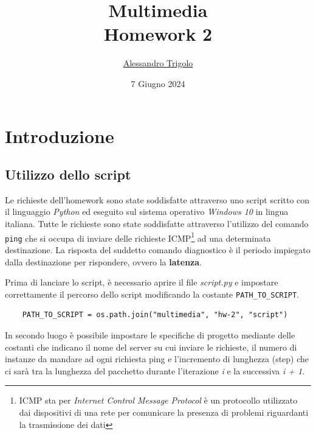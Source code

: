 \title{\vspace{160px} \textbf{\huge{Multimedia}} \\\vspace{17.5px} \LARGE{Homework 2}  \vspace{10px}}
\author{\href{https://github.com/imAlessas}{Alessandro Trigolo}}
\date{7 Giugno 2024}



\maketitle\newpage

\tableofcontents
\vspace{50px}
\listoffigures
\newpage

\listoftodos\newpage

\section{Introduzione}

\vspace{15px}\subsection{Utilizzo dello script}

Le richieste dell'homework sono state soddisfatte attraverso uno script scritto con il linguaggio \textsl{Python} ed eseguito sul sistema operativo \textsl{Windows 10} in lingua italiana. Tutte le richieste sono state soddisfatte attraverso l'utilizzo del comando \texttt{ping} che si occupa di inviare delle richieste ICMP\footnote{ICMP sta per \textsl{Internet Control Message Protocol} è un protocollo utilizzato dai dispositivi di una rete per comunicare la presenza di problemi riguardanti la trasmissione dei dati} ad una determinata destinazione. La risposta del suddetto comando diagnostico è il periodo impiegato dalla destinazione per rispondere, ovvero la \textbf{latenza}.

Prima di lanciare lo script, è necessario aprire il file \textsl{script.py} e impostare correttamente il percorso dello script modificando la costante \texttt{PATH\_TO\_SCRIPT}.
\begin{lstlisting}
    PATH_TO_SCRIPT = os.path.join("multimedia", "hw-2", "script")
\end{lstlisting}

\noindent In secondo luogo è possibile impostare le specifiche di progetto mediante delle costanti che indicano il nome del server su cui inviare le richieste, il numero di instanze da mandare ad ogni richiesta ping e l'incremento di lunghezza (step) che ci sarà tra la lunghezza del pacchetto durante l'iterazione \textit{i} e la successiva \textit{i + 1}.

